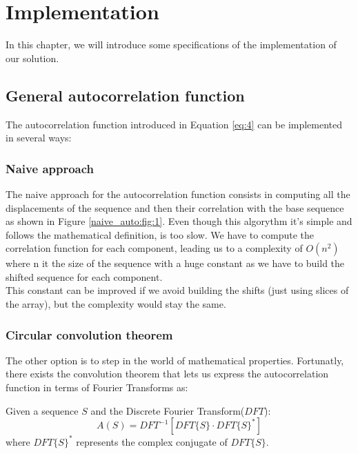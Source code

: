 \chapter{Implementation}
  In this chapter, we will introduce some specifications of the implementation
  of our solution.\\


  \section{General autocorrelation function}
    The autocorrelation function introduced in Equation \eqref{eq:4} can be
    implemented in several ways:

      \subsection{Naive approach}
        The naive approach for the autocorrelation function consists in
        computing all the displacements of the sequence and then
        their correlation with the base sequence as shown in Figure
        \ref{naive_auto:fig:1}. Even though this algorythm it's simple and
        follows the mathematical definition, is too slow. We have to compute
        the correlation function for each component, leading us to a
        complexity of $O(n^{2})$ where n it the size of the sequence with a
        huge constant as we have to build the shifted sequence for each
        component.\\

        This constant can be improved if we avoid building the shifts (just
        using slices of the array), but the complexity would stay the same.

      \subsection{Circular convolution theorem}
        The other option is to step in the world of mathematical properties.
        Fortunatly, there exists the convolution theorem\cite{golomb_ref} that
        lets us express the autocorrelation function in terms of Fourier
        Transforms as:
        \begin{theorem}
          Given a sequence $S$ and the Discrete Fourier Transform($DFT$):
          \begin{equation}
            A(S) = DFT^{-1}[DFT\{S\} · DFT\{S\}^{*}]
          \end{equation}
          where $DFT\{S\}^{*}$ represents the complex conjugate of $DFT\{S\}$.
        \end{theorem}

